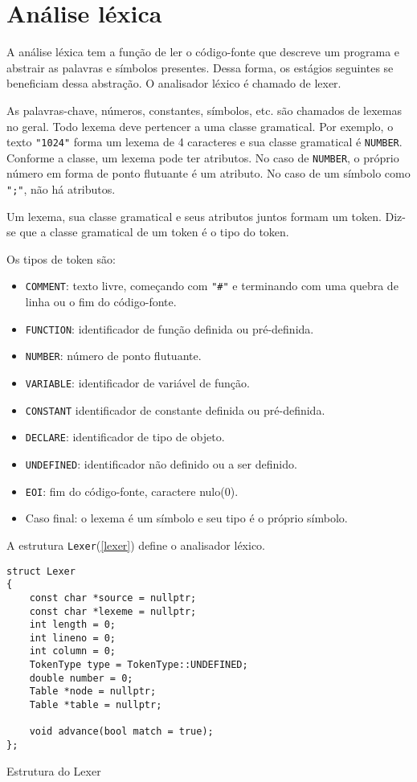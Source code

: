 \documentclass[10pt,a4paper]{article}
\newenvironment{code}{\captionsetup{type=listing}}{}
\begin{document}

\newpage
\section{Análise léxica}
A análise léxica tem a função de ler o código-fonte que descreve um programa e abstrair as palavras e símbolos presentes.
Dessa forma, os estágios seguintes se beneficiam dessa abstração. O analisador léxico é chamado de lexer.

As palavras-chave, números, constantes, símbolos, etc. são chamados de lexemas no geral.
Todo lexema deve pertencer a uma classe gramatical.
Por exemplo, o texto \texttt{"1024"} forma um lexema de 4 caracteres e sua classe gramatical é \texttt{NUMBER}.
Conforme a classe, um lexema pode ter atributos.
No caso de \texttt{NUMBER}, o próprio número em forma de ponto flutuante é um atributo.
No caso de um símbolo como \texttt{";"}, não há atributos.

Um lexema, sua classe gramatical e seus atributos juntos formam um token.
Diz-se que a classe gramatical de um token é o tipo do token.

Os tipos de token são:
\begin{itemize}
\item \texttt{COMMENT}: texto livre, começando com \texttt{"\#"} e
terminando com uma quebra de linha ou o fim do código-fonte.
\item \texttt{FUNCTION}: identificador de função definida ou pré-definida.
\item \texttt{NUMBER}: número de ponto flutuante.
\item \texttt{VARIABLE}: identificador de variável de função.
\item \texttt{CONSTANT} identificador de constante definida ou pré-definida.
\item \texttt{DECLARE}: identificador de tipo de objeto.
\item \texttt{UNDEFINED}: identificador não definido ou a ser definido.
\item \texttt{EOI}: fim do código-fonte, caractere nulo(0).
\item Caso final: o lexema é um símbolo e seu tipo é o próprio símbolo.

\end{itemize}

A estrutura \texttt{Lexer}(\ref{lexer}) define o analisador léxico.
\begin{code}
\begin{verbatim}
struct Lexer
{
    const char *source = nullptr;
    const char *lexeme = nullptr;
    int length = 0;
    int lineno = 0;
    int column = 0;
    TokenType type = TokenType::UNDEFINED;
    double number = 0;
    Table *node = nullptr;
    Table *table = nullptr;

    void advance(bool match = true);
};
\end{verbatim}
\caption{Estrutura do Lexer}
\label{lexer}
\end{code}
\end{document}
